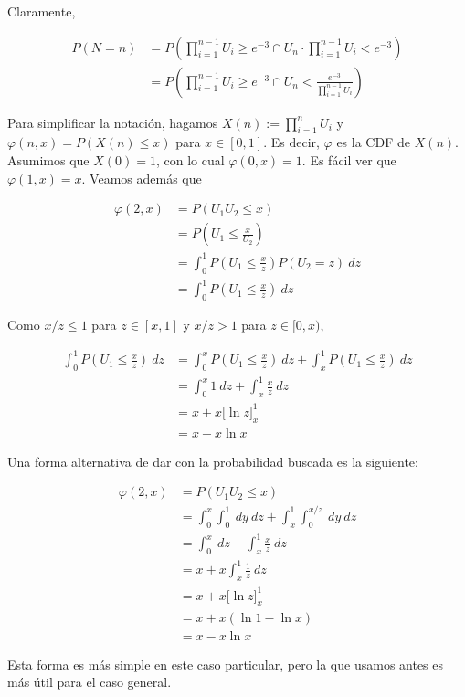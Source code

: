 \documentclass[a4paper, 12pt]{article}
\begin{document}
Claramente, 

\begin{align*}
  P(N = n) 
  &= P \left( \prod_{i=1}^{n-1} U_i \geq e^{-3} \cap U_n \cdot \prod_{i=1}^{n-1}
  U_i < e^{-3}\right) \\ 
  &= P \left( \prod_{i=1}^{n-1} U_i \geq e^{-3} \cap U_n  <
    \frac{e^{-3}}{\prod_{i=1}^{n-1}U_i }\right) 
\end{align*}

Para simplificar la notación, hagamos $X(n) := \prod_{i=1}^n U_i$ y $\varphi(n,
x) = P(X(n) \leq x)$ para $x \in [0, 1]$. Es decir, $\varphi$ es la CDF de
$X(n)$. Asumimos que $X(0) = 1$, con lo cual $\varphi(0, x) = 1$. Es fácil ver
que $\varphi(1, x) = x$. Veamos además que 

\begin{align*}
  \varphi(2, x) 
  &= P(U_1 U_2 \leq x) \\ 
  &= P(U_1 \leq \frac{x}{U_2}) \\ 
  &= \int_0^1 P(U_1 \leq \frac{x}{z}) P(U_2 = z) ~ dz  \\ 
  &= \int_0^1 P\left( U_1 \leq \frac{x}{z} \right)  ~ dz
\end{align*}

Como $x / z \leq 1$ para $z \in [x, 1]$ y $x / z > 1$ para $z \in [0, x)$,

\begin{align*}
  \int_0^1 P\left( U_1 \leq \frac{x}{z} \right) ~ dz 
  &=\int_0^x P\left( U_1 \leq \frac{x}{z} \right) ~ dz + \int_x^1 P\left( U_1
  \leq \frac{x}{z} \right) ~ dz \\ 
  &= \int_0^x 1 ~ dz + \int_x^1 \frac{x}{z} ~ dz \\ 
  &= x + x \Big[ \ln z\Big]_x^1 \\ 
  &= x - x \ln x
\end{align*}

\begin{myframe}
  Una forma alternativa de dar con la probabilidad buscada es la siguiente:
  
\begin{align*}
  \varphi(2, x) 
  &= P(U_1 U_2 \leq x)  \\ 
  &=\int_0^x \int_0^1 ~ dy ~ dz + \int_x^1 \int_{0}^{x / z} ~ dy ~ dz \\ 
  &=\int_0^x ~ dz + \int_{x}^1 \frac{x}{z} ~ dz \\ 
  &= x + x \int_x^1 \frac{1}{z} ~ dz \\ 
  &= x + x \Big[ \ln z \Big]_{x}^1 \\ 
  &= x + x(\ln 1 - \ln x) \\ 
  &= x - x \ln x
\end{align*}

Esta forma es más simple en este caso particular, pero la que usamos antes
es más útil para el caso general.
\end{myframe}
\end{document}

